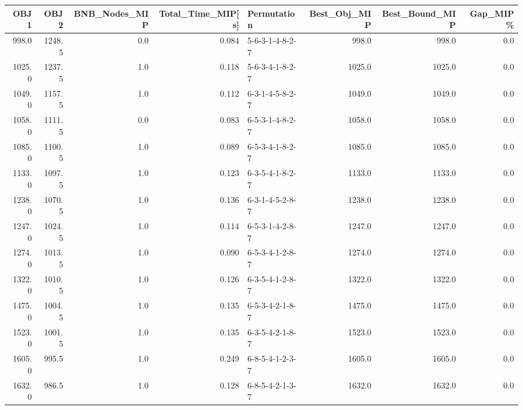 \begin{tabular}{rrrrlrrr}
\toprule
   OBJ1 &    OBJ2 &  BNB\_Nodes\_MIP &  Total\_Time\_MIP[s] &      Permutation &  Best\_Obj\_MIP &  Best\_Bound\_MIP &  Gap\_MIP\% \\
\midrule
  998.0 &  1248.5 &            0.0 &              0.084 &  5-6-3-1-4-8-2-7 &         998.0 &           998.0 &       0.0 \\
 1025.0 &  1237.5 &            1.0 &              0.118 &  5-6-3-4-1-8-2-7 &        1025.0 &          1025.0 &       0.0 \\
 1049.0 &  1157.5 &            1.0 &              0.112 &  6-3-1-4-5-8-2-7 &        1049.0 &          1049.0 &       0.0 \\
 1058.0 &  1111.5 &            0.0 &              0.083 &  6-5-3-1-4-8-2-7 &        1058.0 &          1058.0 &       0.0 \\
 1085.0 &  1100.5 &            1.0 &              0.089 &  6-5-3-4-1-8-2-7 &        1085.0 &          1085.0 &       0.0 \\
 1133.0 &  1097.5 &            1.0 &              0.123 &  6-3-5-4-1-8-2-7 &        1133.0 &          1133.0 &       0.0 \\
 1238.0 &  1070.5 &            1.0 &              0.136 &  6-3-1-4-5-2-8-7 &        1238.0 &          1238.0 &       0.0 \\
 1247.0 &  1024.5 &            1.0 &              0.114 &  6-5-3-1-4-2-8-7 &        1247.0 &          1247.0 &       0.0 \\
 1274.0 &  1013.5 &            1.0 &              0.090 &  6-5-3-4-1-2-8-7 &        1274.0 &          1274.0 &       0.0 \\
 1322.0 &  1010.5 &            1.0 &              0.126 &  6-3-5-4-1-2-8-7 &        1322.0 &          1322.0 &       0.0 \\
 1475.0 &  1004.5 &            1.0 &              0.135 &  6-5-3-4-2-1-8-7 &        1475.0 &          1475.0 &       0.0 \\
 1523.0 &  1001.5 &            1.0 &              0.135 &  6-3-5-4-2-1-8-7 &        1523.0 &          1523.0 &       0.0 \\
 1605.0 &   995.5 &            1.0 &              0.249 &  6-8-5-4-1-2-3-7 &        1605.0 &          1605.0 &       0.0 \\
 1632.0 &   986.5 &            1.0 &              0.128 &  6-8-5-4-2-1-3-7 &        1632.0 &          1632.0 &       0.0 \\
\bottomrule
\end{tabular}
